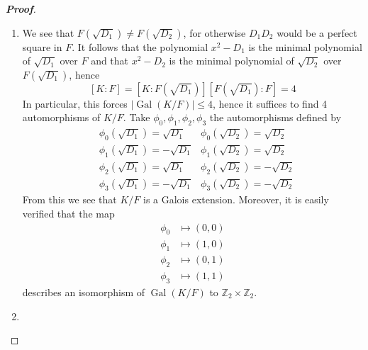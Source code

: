 \documentclass[12pt,leqno]{article}
\theoremstyle{definition}
\newcommand{\Gal}{\operatorname{Gal}}
\newcommand{\Z}{\mathbb{Z}}
\newenvironment{Proof}{\begin{proof}[\textnormal{\textbf{Proof}}]}{\end{proof}}
\begin{document}
\begin{enumerate}
\begin{Proof}
\begin{enumerate}
      \item We see that $F(\sqrt{D_1})\not=F(\sqrt{D_2})$, for otherwise $D_1D_2$ would be a perfect square in $F$. It follows that the polynomial $x^2-D_1$ is the minimal polynomial of $\sqrt{D_1}$ over $F$ and that $x^2-D_2$ is the minimal polynomial of $\sqrt{D_2}$ over $F(\sqrt{D_1})$, hence \[[K:F]=[K:F(\sqrt{D_1})][F(\sqrt{D_1}):F]=4\] In particular, this forces $|\Gal(K/F)|\leq4$, hence it suffices to find 4 automorphisms of $K/F$. Take $\phi_0,\phi_1,\phi_2,\phi_3$ the automorphisms defined by \begin{align*}&\phi_0(\sqrt{D_1})=\sqrt{D_1}&\phi_0(\sqrt{D_2})=\sqrt{D_2}\\&\phi_1(\sqrt{D_1})=-\sqrt{D_1}&\phi_1(\sqrt{D_2})=\sqrt{D_2}\\&\phi_2(\sqrt{D_1})=\sqrt{D_1}&\phi_2(\sqrt{D_2})=-\sqrt{D_2}\\&\phi_3(\sqrt{D_1})=-\sqrt{D_1}&\phi_3(\sqrt{D_2})=-\sqrt{D_2}\end{align*} From this we see that $K/F$ is a Galois extension. Moreover, it is easily verified that the map \begin{align*}\phi_0&\mapsto(0,0)\\\phi_1&\mapsto(1,0)\\\phi_2&\mapsto(0,1)\\\phi_3&\mapsto(1,1)\end{align*} describes an isomorphism of $\Gal(K/F)$ to $\Z_2\times\Z_2$.
      \item 
     \end{enumerate}

    \end{Proof}


\end{enumerate}
\end{document}
